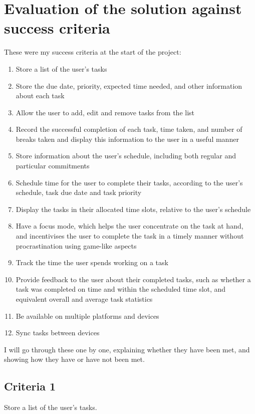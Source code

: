 \documentclass{article}
\begin{document}
\section{Evaluation of the solution against success criteria}
These were my success criteria at the start of the project:
\begin{enumerate}
	\item Store a list of the user's tasks
	\item Store the due date, priority, expected time needed, and other information
	      about each task
	\item Allow the user to add, edit and remove tasks from the list
	\item Record the successful completion of each task, time taken, and number of
	      breaks taken and display this information to the user in a useful manner
	\item Store information about the user's schedule,
	      including both regular and particular commitments
	\item Schedule time for the user to complete their tasks, according to the
	      user's schedule, task due date and task priority
	\item Display the tasks in their allocated time slots,
    relative to the user's schedule
	\item Have a focus mode, which helps the user concentrate on the task at hand,
	      and incentivises the user to complete the task in a timely manner without
	      procrastination using game-like aspects
	\item Track the time the user spends working on a task
	\item Provide feedback to the user about their completed tasks,
	      such as whether a task was completed on time and within the scheduled time slot,
	      and equivalent overall and average task statistics
	\item Be available on multiple platforms and devices
	\item Sync tasks between devices
\end{enumerate}

I will go through these one by one,
explaining whether they have been met,
and showing how they have or have not been met.

\subsection{Criteria 1}
Store a list of the user's tasks.
\end{document}
